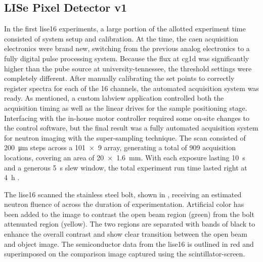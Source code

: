 \documentclass[../../../main.tex]{subfiles}%
\begin{document}
%
    \subsection{LISe Pixel Detector v1}%
    \label{sec:chapter-4:semiconductor-16-channel:version-1}%
    In the first \gls{lise16} experiments, a large portion of the allotted experiment time consisted of system setup and calibration.
    At the time, the \gls{caen} acquisition electronics were brand new, switching from the previous analog electronics to a fully digital pulse processing system.
    Because the flux at \gls{cg1d} was significantly higher than the \gls{pube} source at \gls{university-tennessee}, the threshold settings were completely different.    
    After manually calibrating the set points to correctly register spectra for each of the 16 channels, the automated acquisition system was ready.
    As mentioned, a custom \gls{labview} application controlled both the acquisition timing as well as the linear drives for the sample positioning stage.
    Interfacing with the in-house motor controller required some on-site changes to the control software, but the final result was a fully automated acquisition system for neutron imaging with the \gls{super-sampling} technique.
    The scan consisted of \SI{200}{\micro\meter} steps across a \num{101x9} array, generating a total of \num{909} acquisition locations, covering an area of \SI{20x1.6}{\milli\meter}.
    With each exposure lasting \SI{10}{\second} and a generous \SI{5}{\second} slew window, the total experiment run time lasted right at \SI{4}{\hour} \cite{Herrera_2016}.
    \par%
    The \gls{lise16} scanned the stainless steel bolt, shown in , receiving an estimated neutron fluence of  across the duration of experimentation.
    Artificial color has been added to the image to contrast the open beam region (green) from the bolt attenuated region (yellow).
    The two regions are separated with bands of black to enhance the overall contrast and show clear transition between the open beam and object image.
    The semiconductor data from the \gls{lise16} is outlined in red and superimposed on the comparison image captured using the \gls{scintillator-screen}.
\end{document}
